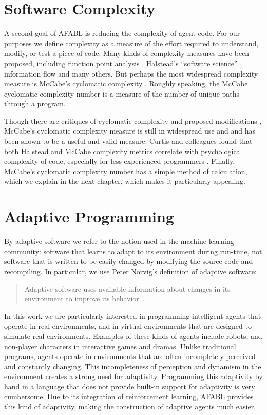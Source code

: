 

\section{Software Complexity}

A second goal of AFABL is reducing the complexity of agent code. For our purposes we define complexity as a measure of the effort required to understand, modify, or test a piece of code. Many kinds of complexity measures have been proposed, including function point analysis \cite{albrecht1979measuring}, Halstead's ``software science'' \cite{halstead1977elements}, information flow \cite{henry1981software} and many others. But perhaps the most widespread complexity measure is McCabe's cyclomatic complexity \cite{mccabe1976complexity,mccabe1989design}. Roughly speaking, the McCabe cyclomatic complexity number is a measure of the number of unique paths through a program.

Though there are critiques of cyclomatic complexity
\cite{gill1991cyclomatic} and proposed modifications \cite{weyuker1988evaluating}, McCabe's cyclomatic complexity measure is still in widespread use and and has been shown to be a useful and valid measure. Curtis and colleagues found that both Halstead and McCabe complexity metrics correlate with psychological complexity of code, especially for less experienced programmers \cite{curtis1979measuring}. Finally, McCabe's cyclomatic complexity number has a simple method of calculation, which we explain in the next chapter, which makes it particularly appealing.

\section{Adaptive Programming}

By adaptive software we refer to the notion used in the machine learning community: software that learns to adapt to its environment during run-time, not software that is written to be easily changed by modifying the source code and recompiling.  In particular, we use Peter Norvig's definition of adaptive software:

\begin{quote}
Adaptive software uses available information about changes in its
environment to improve its behavior~\cite{norvig1998adaptive}.
\end{quote}

In this work we are particularly interested in programming intelligent agents that operate in real environments, and in virtual environments that are designed to simulate real environments.  Examples of these kinds of agents include robots, and non-player characters in interactive games and dramas.  Unlike traditional programs, agents operate in environments that are often incompletely perceived and constantly changing.  This incompleteness of perception and dynamism in the environment creates a strong need for adaptivity.  Programming this adaptivity by hand in a language that does not provide built-in support for adaptivity is very cumbersome.  Due to its integration of reinforcement learning, AFABL provides this kind of adaptivity, making the construction of adaptive agents much easier.


